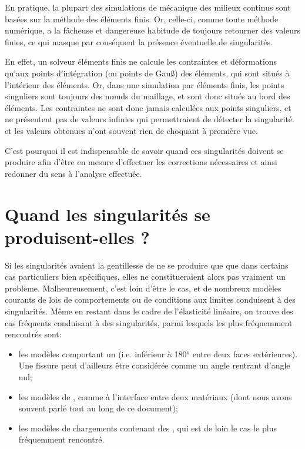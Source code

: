 \medskip
En pratique, la plupart des simulations de mécanique des milieux continus sont basées sur la
méthode des éléments finis. Or, celle-ci, comme toute méthode numérique, a la fâcheuse
et dangereuse habitude de toujours retourner des valeurs finies, ce qui masque par conséquent la présence
éventuelle de singularités.

\medskip
En effet, un solveur éléments finis ne calcule les contraintes et déformations qu'aux points
d'intégration (ou points de Gauß) des éléments, qui sont situés à l'intérieur des éléments.
Or, dans une simulation par éléments finis, les points singuliers sont toujours des nœuds du
maillage, et sont donc situés au bord des éléments. Les contraintes ne sont donc jamais
calculées aux points singuliers, et ne présentent pas de valeurs infinies qui permettraient de
détecter la singularité.  et les valeurs obtenues n'ont souvent rien de choquant à première
vue.

C'est pourquoi il est indispensable de savoir quand ces singularités doivent se produire
afin d'être en mesure d'effectuer les corrections nécessaires et ainsi redonner du
sens à l'analyse effectuée.


\medskip
\section{Quand les singularités se produisent-elles ?}

Si les singularités avaient la gentillesse de ne se produire que que dans certains cas particuliers
bien spécifiques, elles ne constitueraient alors pas vraiment un problème.
Malheureusement, c'est loin d'être le cas, et de nombreux modèles courants de
lois de comportements ou de conditions aux limites conduisent à des singularités.
Même en restant dans le cadre de l'élasticité linéaire, on trouve des cas fréquents
conduisant à des singularités, parmi lesquels les plus fréquemment rencontrés sont:
\medskip
\begin{itemize}
  \item les modèles comportant un  (i.e. inférieur à
	180$^o$ entre deux faces extérieures). Une fissure peut d'ailleurs être considérée
	comme un angle rentrant d'angle nul;

  \item les modèles de , comme à
	l'interface entre deux matériaux (dont nous avons souvent parlé tout au long de ce
	document);
  \item les modèles de chargements contenant des , qui est
	de loin le cas le plus fréquemment rencontré.
\end{itemize}

